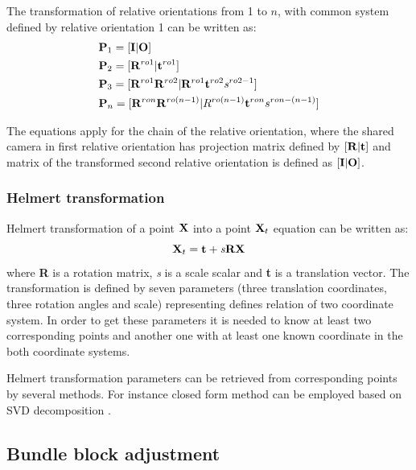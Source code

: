 \documentclass[a4paper,12pt]{article}
\newcommand{\ematr}[1]{
{\bf #1}
}
\newcommand{\evect}[1]{
{\bf #1}
}
\newcommand{\escal}[1]{
{\it #1}
}
\begin{document}
The transformation of relative orientations from 1 to $n$, with common system defined by relative orientation 1 can be written as: 
\begin{equation}
\label{eq:comm_rel}
\begin{split}
&\ematr{P}_{1} = [\ematr{I}|\evect{O}] \\
&\ematr{P}_{2} = [\ematr{R}^{ro1}|\evect{t}^{ro1}] \\
&\ematr{P}_{3} = [\ematr{R}^{ro1} \ematr{R}^{ro2}| \ematr{R}^{ro1} \evect{t}^{ro2} \escal{s}^{ro2-1}] \\
&\ematr{P}_{n} = [\ematr{R}^{ron} \ematr{R}^{ro(n - 1)}| R^{ro(n - 1)} \evect{t}^{ron} {s}^{ron- (n-1)}] \\
\end{split}
\end{equation}


The equations apply for the chain of the relative orientation, where the shared camera in first relative orientation has 
projection matrix defined by $[\ematr{R}|\evect{t}]$ and matrix of the transformed second relative orientation is 
defined as $[\ematr{I}|\ematr{O}]$.

\subsubsection{Helmert transformation}
\label{sec:helmert}

Helmert transformation of a point $\evect{X}$ into a point $\ematr{X}_{t}$ equation can be written as:
\begin{equation}
\ematr{X}_{t} = \evect{t} + \escal{s}\ematr{R}\evect{X} \\
\end{equation}
where \ematr{R} is a rotation matrix, \escal{s} is a scale scalar and  \evect{t} is a translation vector.
The transformation is defined by seven parameters (three translation coordinates, three rotation angles and scale)
representing defines relation of two coordinate system.
In order to get these parameters it is needed to know at least two corresponding points and  another one with 
at least one known coordinate in the both coordinate systems. 


Helmert transformation parameters can be retrieved from corresponding points by several methods.  
For instance closed form method can be employed based on SVD decomposition
\cite{sjoberg2013closed}.

\subsection{Bundle block adjustment}
\end{document}

